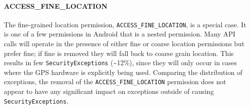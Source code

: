 \paragraph{\bfseries \ttfamily ACCESS\_FINE\_LOCATION}
The fine-grained location permission, \texttt{ACCESS\_FINE\_LOCATION}, is a special case. It is one of a few permissions in Android that is a nested permission. Many API calls will operate in the presence of either fine or coarse location permissions but prefer fine; if fine is removed they will fall back to coarse grain location. This results in few \texttt{SecurityExceptions} (\textasciitilde12\%), since they will only occur in cases where the GPS hardware is explicitly being used.  Comparing the distribution of exceptions, the removal of the \texttt{ACCESS\_FINE\_LOCATION} permission does not appear to have any significant impact on exceptions outside of causing \texttt{SecurityExceptions}.
